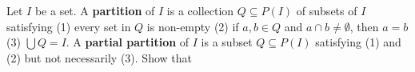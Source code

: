 \begin{exercise}
Let \(I\) be a set.
A \textbf{partition} of \(I\) is a collection \(Q \subseteq P(I)\) of subsets of \(I\) satisfying (1) every set in \(Q\) is non-empty (2) if \(a, b \in Q\) and \(a \cap b \neq \emptyset\), then \(a = b\) (3) \(\bigcup Q = I\).
A \textbf{partial partition} of \(I\) is a subset \(Q \subseteq P(I)\) satisfying (1) and (2) but not necessarily (3).
Show that
\end{exercise}